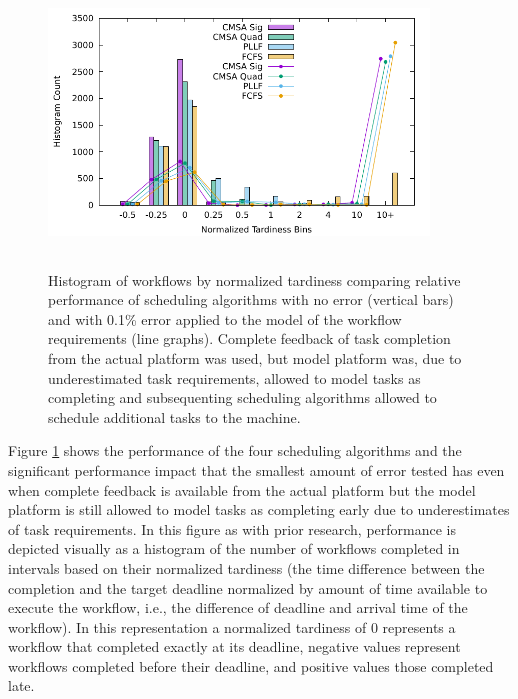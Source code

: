 \documentclass[10pt]{csce}
\begin{document}
\begin{figure}
	\begin{center}
		\includegraphics[width=0.9\textwidth,height=3in]{figures/Histogram_All_NoLoss_NoBias_LowAllError.pdf}
	\end{center}
	\caption{Histogram of workflows by normalized tardiness comparing
		relative performance of scheduling algorithms with no error (vertical
		bars) and with 0.1\% error applied to the model of the workflow
		requirements (line graphs).  Complete feedback of task completion from
		the actual platform was used, but model platform was, due to
		underestimated task requirements, allowed to model tasks as completing
		and subsequenting scheduling algorithms allowed to schedule additional
		tasks to the machine.}
	\label{fig:noloss-nobias-lowerror}
\end{figure}

Figure \ref{fig:noloss-nobias-lowerror} shows the performance of the four
scheduling algorithms and the significant performance impact that the smallest
amount of error tested has even when complete feedback is available from the
actual platform but the model platform is still allowed to model tasks as
completing early due to underestimates of task requirements. In this figure
as with prior research, performance is depicted visually as a histogram of the
number of workflows completed in intervals based on their normalized tardiness
(the time difference between the completion and the target deadline normalized
by amount of time available to execute the workflow, i.e., the difference of
deadline and arrival time of the workflow). In this representation a normalized
tardiness of 0 represents a workflow that completed exactly at its deadline,
negative values represent workflows completed before their deadline, and
positive values those completed late.
\end{document}
